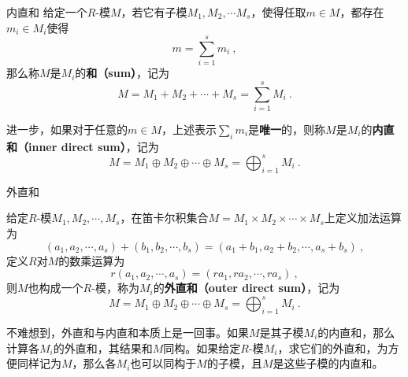 





\begin{definition}{内直和}
给定一个$R$-模$M$，若它有子模$M_1, M_2, \cdots M_s$，使得任取$m\in M$，都存在$m_i\in M_i$使得
\begin{equation}
m = \sum_{i=1}^{s} m_i~, 
\end{equation}
那么称$M$是$M_i$的\textbf{和（sum）}，记为
\begin{equation}
M=M_1+M_2+\cdots+M_s=\sum_{i=1}^s M_i~.
\end{equation}

进一步，如果对于任意的$m\in M$，上述表示$\sum_i m_i$是\textbf{唯一}的，则称$M$是$M_i$的\textbf{内直和（inner direct sum）}，记为
\begin{equation}
M=M_1\oplus M_2\oplus \cdots \oplus M_s= \bigoplus_{i=1}^s M_i~.
\end{equation}
\end{definition}


\begin{definition}{外直和}

给定$R$-模$M_1, M_2, \cdots, M_s$，在笛卡尔积集合$M=M_1\times M_2\times \cdots \times M_s$上定义加法运算为
\begin{equation}
(a_1, a_2, \cdots, a_s)+(b_1, b_2, \cdots, b_s) = (a_1+b_1, a_2+b_2, \cdots, a_s+b_s)~, 
\end{equation}
定义$R$对$M$的数乘运算为
\begin{equation}
r(a_1, a_2, \cdots, a_s) = (ra_1, ra_2, \cdots, ra_s)~, 
\end{equation}
则$M$也构成一个$R$-模，称为$M_i$的\textbf{外直和（outer direct sum）}，记为
\begin{equation}
M=M_1\oplus M_2\oplus \cdots \oplus M_s= \bigoplus_{i=1}^s M_i~.
\end{equation}

\end{definition}




不难想到，外直和与内直和本质上是一回事。如果$M$是其子模$M_i$的内直和，那么计算各$M_i$的外直和，其结果和$M$同构。如果给定$R$-模$M_i$，求它们的外直和，为方便同样记为$M$，那么各$M_i$也可以同构于$M$的子模，且$M$是这些子模的内直和。












